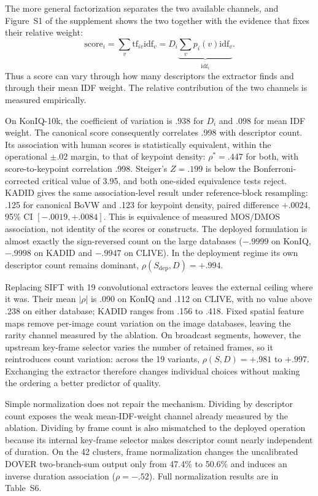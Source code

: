 The more general factorization separates the two available channels, and
Figure~S1 of the supplement shows the two together with the evidence that fixes their
relative weight:
\begin{equation}
\mathrm{score}_i=\sum_v\mathrm{tf}_{iv}\mathrm{idf}_v
=D_i\underbrace{\sum_v p_i(v)\mathrm{idf}_v}_{\overline{\mathrm{idf}}_i}.
\label{eq:factor}
\end{equation}
Thus a score can vary through how many descriptors the extractor finds and
through their mean IDF weight. The relative contribution of the two channels is measured empirically.

On KonIQ-10k, the coefficient of variation is .938 for $D_i$ and .098 for mean
IDF weight. The canonical score consequently correlates .998 with descriptor
count. Its association with human scores is statistically equivalent, within
the operational $\pm.02$ margin, to that of keypoint density:
$\rho^{*}=.447$ for both, with score-to-keypoint correlation .998. Steiger's
$Z=.199$ is below the Bonferroni-corrected critical value of 3.95, and both
one-sided equivalence tests reject. KADID gives the same association-level
result under reference-block resampling: .125 for canonical BoVW and .123 for
keypoint density, paired difference $+.0024$, 95\% CI
$[-.0019,+.0084]$. This is equivalence of measured MOS/DMOS association, not
identity of the scores or constructs. The deployed formulation is almost exactly the sign-reversed
count on the large databases ($-.9999$ on KonIQ, $-.9998$ on KADID and
$-.9947$ on CLIVE). In the deployment regime its own descriptor count remains
dominant, $\rho(S_{\mathrm{dep}},D)=+.994$.

Replacing SIFT with 19 convolutional extractors leaves the external ceiling where it was.
Their mean $|\rho|$ is .090 on KonIQ and .112 on CLIVE, with no value
above .238 on either database; KADID ranges from .156 to .418. Fixed spatial
feature maps remove per-image count variation on the image databases, leaving
the rarity channel measured by the ablation. On broadcast segments, however,
the upstream key-frame selector varies the number of retained frames, so it
reintroduces count variation: across the 19 variants,
$\rho(S,D)=+.981$ to $+.997$. Exchanging the extractor therefore changes individual
choices without making the ordering a better predictor of quality.

Simple normalization does not repair the mechanism. Dividing by descriptor
count exposes the weak mean-IDF-weight channel already measured by the ablation. Dividing
by frame count is also mismatched to the deployed operation because its internal
key-frame selector makes descriptor count nearly independent of duration. On the
42 clusters, frame normalization changes the uncalibrated DOVER two-branch-sum
output only from 47.4\% to 50.6\% and induces an inverse duration association
($\rho=-.52$). Full normalization results are in Table~S6.

